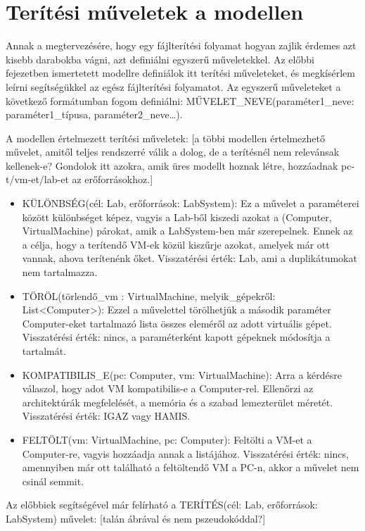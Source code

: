 \section{Terítési műveletek a modellen}

Annak a megtervezésére, hogy egy fájlterítési folyamat hogyan zajlik érdemes azt kisebb darabokba vágni, azt definiálni egyszerű műveletekkel.
Az előbbi fejezetben ismertetett modellre definiálok itt terítési műveleteket, és megkísérlem leírni segítségükkel az egész fájlterítési folyamatot.
Az egyszerű műveleteket a következő formátumban fogom definiálni: MŰVELET\_NEVE(paraméter1\_neve: paraméter1\_típusa, paraméter2\_neve\ldots).

A modellen értelmezett terítési műveletek: [a többi modellen értelmezhető művelet, amitől teljes rendszerré válik a dolog, de a terítésnél nem relevánsak kellenek-e? Gondolok itt azokra, amik üres modellt hoznak létre, hozzáadnak pc-t/vm-et/lab-et az erőforrásokhoz.]

\begin{itemize}
  \item KÜLÖNBSÉG(cél: Lab, erőforrások: LabSystem): Ez a művelet a paraméterei között különbséget képez, vagyis a Lab-ből kiszedi azokat a (Computer, VirtualMachine) párokat, amik a LabSystem-ben már szerepelnek. Ennek az a célja, hogy a terítendő VM-ek közül kiszűrje azokat, amelyek már ott vannak, ahova terítenénk őket. Visszatérési érték: Lab, ami a duplikátumokat nem tartalmazza.
  \item TÖRÖL(törlendő\_vm : VirtualMachine, melyik\_gépekről: List<Computer>): Ezzel a művelettel törölhetjük a második paraméter Computer-eket tartalmazó lista összes eleméről az adott virtuális gépet. Visszatérési érték: nincs, a paraméterként kapott gépeknek módosítja a tartalmát.
  \item KOMPATIBILIS\_E(pc: Computer, vm: VirtualMachine): Arra a kérdésre válaszol, hogy adot VM kompatibilis-e a Computer-rel. Ellenőrzi az architektúrák megfelelését, a memória és a szabad lemezterület méretét. Visszatérési érték: IGAZ vagy HAMIS.
  \item FELTÖLT(vm: VirtualMachine, pc: Computer): Feltölti a VM-et a Computer-re, vagyis hozzáadja annak a  listájához. Visszatérési érték: nincs, amennyiben már ott található a feltöltendő VM a PC-n, akkor a művelet nem csinál semmit.
\end{itemize}

Az előbbiek segítségével már felírható a TERÍTÉS(cél: Lab, erőforrások: LabSystem) művelet: [talán ábrával és nem pszeudokóddal?]

